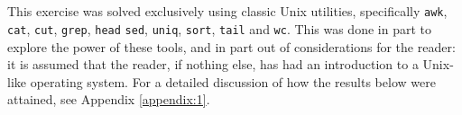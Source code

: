 
\section{}

This exercise was solved exclusively using classic Unix utilities\footnotemark,
specifically \texttt{awk}, \texttt{cat}, \texttt{cut}, \texttt{grep},
\texttt{head} \texttt{sed}, \texttt{uniq}, \texttt{sort}, \texttt{tail} and
\texttt{wc}.  This was done in part to explore the power of these tools, and in
part out of considerations for the reader: it is assumed that the reader, if
nothing else, has had an introduction to a Unix-like operating system. For a
detailed discussion of how the results below were attained, see Appendix
\ref{appendix:1}.


